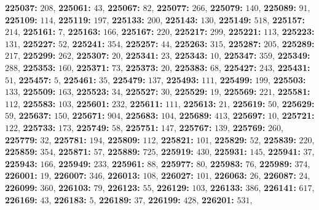 \textsf{\bfseries 225037:} $208$, \textsf{\bfseries 225061:} $43$, \textsf{\bfseries 225067:} $82$, \textsf{\bfseries 225077:} $266$, \textsf{\bfseries 225079:} $140$, \textsf{\bfseries 225089:} $91$, \textsf{\bfseries 225109:} $114$, \textsf{\bfseries 225119:} $197$, \textsf{\bfseries 225133:} $200$, \textsf{\bfseries 225143:} $130$, \textsf{\bfseries 225149:} $518$, \textsf{\bfseries 225157:} $214$, \textsf{\bfseries 225161:} $7$, \textsf{\bfseries 225163:} $166$, \textsf{\bfseries 225167:} $220$, \textsf{\bfseries 225217:} $299$, \textsf{\bfseries 225221:} $113$, \textsf{\bfseries 225223:} $131$, \textsf{\bfseries 225227:} $52$, \textsf{\bfseries 225241:} $354$, \textsf{\bfseries 225257:} $44$, \textsf{\bfseries 225263:} $315$, \textsf{\bfseries 225287:} $205$, \textsf{\bfseries 225289:} $217$, \textsf{\bfseries 225299:} $262$, \textsf{\bfseries 225307:} $20$, \textsf{\bfseries 225341:} $23$, \textsf{\bfseries 225343:} $10$, \textsf{\bfseries 225347:} $359$, \textsf{\bfseries 225349:} $288$, \textsf{\bfseries 225353:} $160$, \textsf{\bfseries 225371:} $73$, \textsf{\bfseries 225373:} $20$, \textsf{\bfseries 225383:} $68$, \textsf{\bfseries 225427:} $243$, \textsf{\bfseries 225431:} $51$, \textsf{\bfseries 225457:} $5$, \textsf{\bfseries 225461:} $35$, \textsf{\bfseries 225479:} $137$, \textsf{\bfseries 225493:} $111$, \textsf{\bfseries 225499:} $199$, \textsf{\bfseries 225503:} $133$, \textsf{\bfseries 225509:} $163$, \textsf{\bfseries 225523:} $34$, \textsf{\bfseries 225527:} $30$, \textsf{\bfseries 225529:} $19$, \textsf{\bfseries 225569:} $221$, \textsf{\bfseries 225581:} $112$, \textsf{\bfseries 225583:} $103$, \textsf{\bfseries 225601:} $232$, \textsf{\bfseries 225611:} $111$, \textsf{\bfseries 225613:} $21$, \textsf{\bfseries 225619:} $50$, \textsf{\bfseries 225629:} $59$, \textsf{\bfseries 225637:} $150$, \textsf{\bfseries 225671:} $904$, \textsf{\bfseries 225683:} $104$, \textsf{\bfseries 225689:} $413$, \textsf{\bfseries 225697:} $10$, \textsf{\bfseries 225721:} $122$, \textsf{\bfseries 225733:} $173$, \textsf{\bfseries 225749:} $58$, \textsf{\bfseries 225751:} $147$, \textsf{\bfseries 225767:} $139$, \textsf{\bfseries 225769:} $260$, \textsf{\bfseries 225779:} $32$, \textsf{\bfseries 225781:} $194$, \textsf{\bfseries 225809:} $112$, \textsf{\bfseries 225821:} $101$, \textsf{\bfseries 225829:} $52$, \textsf{\bfseries 225839:} $220$, \textsf{\bfseries 225859:} $354$, \textsf{\bfseries 225871:} $57$, \textsf{\bfseries 225889:} $725$, \textsf{\bfseries 225919:} $430$, \textsf{\bfseries 225931:} $145$, \textsf{\bfseries 225941:} $37$, \textsf{\bfseries 225943:} $166$, \textsf{\bfseries 225949:} $233$, \textsf{\bfseries 225961:} $88$, \textsf{\bfseries 225977:} $80$, \textsf{\bfseries 225983:} $76$, \textsf{\bfseries 225989:} $374$, \textsf{\bfseries 226001:} $19$, \textsf{\bfseries 226007:} $346$, \textsf{\bfseries 226013:} $108$, \textsf{\bfseries 226027:} $101$, \textsf{\bfseries 226063:} $26$, \textsf{\bfseries 226087:} $24$, \textsf{\bfseries 226099:} $360$, \textsf{\bfseries 226103:} $79$, \textsf{\bfseries 226123:} $55$, \textsf{\bfseries 226129:} $103$, \textsf{\bfseries 226133:} $386$, \textsf{\bfseries 226141:} $617$, \textsf{\bfseries 226169:} $43$, \textsf{\bfseries 226183:} $5$, \textsf{\bfseries 226189:} $37$, \textsf{\bfseries 226199:} $428$, \textsf{\bfseries 226201:} $531$, 

